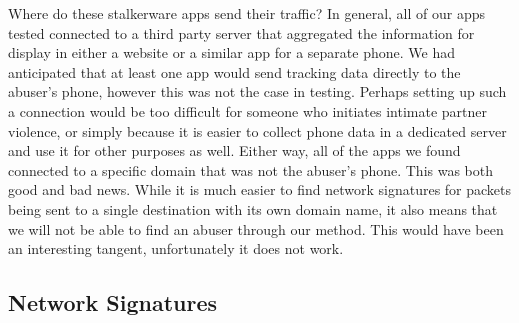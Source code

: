 \documentclass[acmtog]{acmart}
\begin{document}
Where do these stalkerware apps send their traffic? In general, all of our apps tested connected to a third party server that aggregated the information for display in either a website or a similar app for a separate phone. We had anticipated that at least one app would send tracking data directly to the abuser's phone, however this was not the case in testing. Perhaps setting up such a connection would be too difficult for someone who initiates intimate partner violence, or simply because it is easier to collect phone data in a dedicated server and use it for other purposes as well. Either way, all of the apps we found connected to a specific domain that was not the abuser's phone. This was both good and bad news. While it is much easier to find network signatures for packets being sent to a single destination with its own domain name, it also means that we will not be able to find an abuser through our method. This would have been an interesting tangent, unfortunately it does not work.
\subsection{Network Signatures}
\label{network_signatures}
\end{document}
